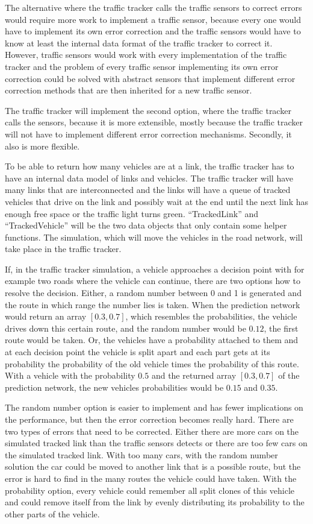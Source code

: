 The alternative where the traffic tracker calls the traffic sensors to correct errors would require more work to implement a traffic sensor, because every one would have to implement its own error correction and the traffic sensors would have to know at least the internal data format of the traffic tracker to correct it. However, traffic sensors would work with every implementation of the traffic tracker and the problem of every traffic sensor implementing its own error correction could be solved with abstract sensors that implement different error correction methods that are then inherited for a new traffic sensor.

The traffic tracker will implement the second option, where the traffic tracker calls the sensors, because it is more extensible, mostly because the traffic tracker will not have to implement different error correction mechanisms. Secondly, it also is more flexible.

To be able to return how many vehicles are at a link, the traffic tracker has to have an internal data model of links and vehicles. The traffic tracker will have many links that are interconnected and the links will have a queue of tracked vehicles that drive on the link and possibly wait at the end until the next link has enough free space or the traffic light turns green. ``TrackedLink'' and ``TrackedVehicle'' will be the two data objects that only contain some helper functions. The simulation, which will move the vehicles in the road network, will take place in the traffic tracker.

If, in the traffic tracker simulation, a vehicle approaches a decision point with for example two roads where the vehicle can continue, there are two options how to resolve the decision. Either, a random number between 0 and 1 is generated and the route in which range the number lies is taken. When the prediction network would return an array $[0.3, 0.7]$, which resembles the probabilities, the vehicle drives down this certain route, and the random number would be $0.12$, the first route would be taken. Or, the vehicles have a probability attached to them and at each decision point the vehicle is split apart and each part gets at its probability the probability of the old vehicle times the probability of this route. With a vehicle with the probability $0.5$ and the returned array $[0.3, 0.7]$ of the prediction network, the new vehicles probabilities would be $0.15$ and $0.35$.

The random number option is easier to implement and has fewer implications on the performance, but then the error correction becomes really hard. There are two types of errors that need to be corrected. Either there are more cars on the simulated tracked link than the traffic sensors detects or there are too few cars on the simulated tracked link. With too many cars, with the random number solution the car could be moved to another link that is a possible route, but the error is hard to find in the many routes the vehicle could have taken. With the probability option, every vehicle could remember all split clones of this vehicle and could remove itself from the link by evenly distributing its probability to the other parts of the vehicle.

